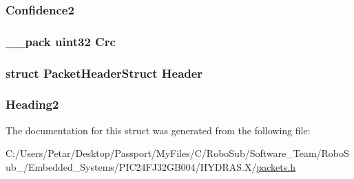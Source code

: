 \subsubsection[{Confidence2}]{ Confidence2}\label{struct_packet_pinger_heading2_get_struct_a59acd93ce28964a3af4c5e4eb479de21}
\hypertarget{struct_packet_pinger_heading2_get_struct_a9ac0191cb1217dfb4164ca0e333de3ac}{}
\subsubsection[{Crc}]{\setlength{\rightskip}{0pt plus 5cm}\+\_\+\+\_\+pack {\bf uint32} Crc}\label{struct_packet_pinger_heading2_get_struct_a9ac0191cb1217dfb4164ca0e333de3ac}
\hypertarget{struct_packet_pinger_heading2_get_struct_ab201af50281aff5ed4f984f994938007}{}
\subsubsection[{Header}]{\setlength{\rightskip}{0pt plus 5cm}struct {\bf Packet\+Header\+Struct} Header}\label{struct_packet_pinger_heading2_get_struct_ab201af50281aff5ed4f984f994938007}
\hypertarget{struct_packet_pinger_heading2_get_struct_abd671b9322a5d710ed3b78a5401fe9c8}{}
\subsubsection[{Heading2}]{ Heading2}\label{struct_packet_pinger_heading2_get_struct_abd671b9322a5d710ed3b78a5401fe9c8}


The documentation for this struct was generated from the following file\+:\begin{DoxyCompactItemize}
\item 
C\+:/\+Users/\+Petar/\+Desktop/\+Passport/\+My\+Files/\+C/\+Robo\+Sub/\+Software\+\_\+\+Team/\+Robo\+Sub\+\_/\+Embedded\+\_\+\+Systems/\+P\+I\+C24\+F\+J32\+G\+B004/\+H\+Y\+D\+R\+A\+S.\+X/\hyperlink{_h_y_d_r_a_s_8_x_2packets_8h}{packets.\+h}\end{DoxyCompactItemize}
